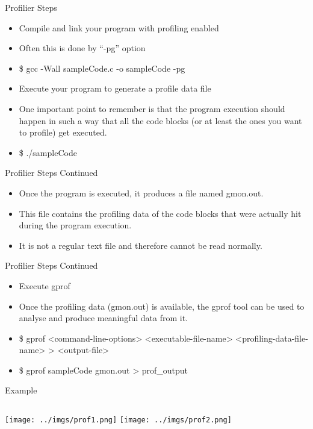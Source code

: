 \documentclass{beamer}
\begin{document}
\begin{frame}{Profilier Steps}
\begin{itemize}
\item Compile and link your program with profiling enabled
\item Often this is done by ``-pg'' option
\item \$ gcc -Wall sampleCode.c -o sampleCode -pg
\item Execute your program to generate a profile data file
\item One important point to remember is that the program execution should happen in such a way that all the code blocks (or at least the ones you want to profile) get executed.
\item \$ ./sampleCode
\end{itemize}
\end{frame}
\begin{frame}{Profilier Steps Continued}
\begin{itemize}
\item Once the program is executed, it produces a file named gmon.out.
\item This file contains the profiling data of the code blocks that were actually hit during the program execution. 
\item It is not a regular text file and therefore cannot be read normally.
\end{itemize}
\end{frame}

\begin{frame}{Profilier Steps Continued}
\begin{itemize}
\item Execute gprof
\item Once the profiling data (gmon.out) is available, the gprof tool can be used to analyse and produce meaningful data from it.
\item \$ gprof <command-line-options> <executable-file-name> <profiling-data-file-name> > <output-file>
\item \$ gprof sampleCode gmon.out > prof\_output
\end{itemize}
\end{frame}

\begin{frame}{Example}
\begin{columns}
\texttt{[image: ../imgs/prof1.png]}
\texttt{[image: ../imgs/prof2.png]}
\end{columns}
\end{frame}
\end{document}
